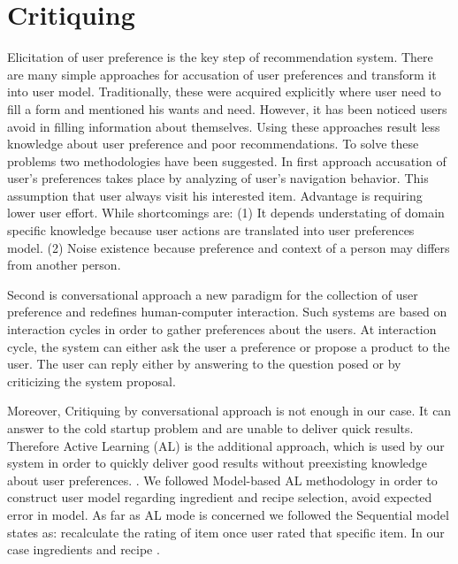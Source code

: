 \section{Critiquing}
Elicitation of user preference is the key step of recommendation system. There are many simple approaches for accusation of user preferences and transform it into user model. Traditionally, these were acquired explicitly where user need to fill a form and mentioned his wants and need. However, it has been noticed users avoid in filling information about themselves. Using these approaches result less knowledge about user preference and poor recommendations. To solve these problems two methodologies have been suggested. In first approach accusation of user’s preferences takes place by analyzing of user’s navigation behavior. This assumption that user always visit his interested item. Advantage is requiring lower user effort. While shortcomings are: (1) It depends understating of domain specific knowledge because user actions are translated into user preferences model. (2) Noise existence because preference and context of a person may differs from another person.\newline

Second is conversational approach a new paradigm for the collection of user preference and redefines human-computer interaction. Such systems are based on interaction cycles in order to gather preferences about the users. At interaction cycle, the system can either ask the user a preference or propose a product to the user. The user can reply either by answering to the question posed or by criticizing the system proposal.\cite{ricci2005critique}\newline

Moreover, Critiquing by conversational approach is not enough in our case. It can answer to the cold startup problem and are unable to deliver quick results. Therefore Active Learning (AL) is the additional approach, which is used by our system in order to quickly deliver good results without preexisting knowledge about user preferences. \cite{lamche2014active}. We followed Model-based AL methodology in order to construct user model regarding ingredient and recipe selection, avoid expected error in model. As far as AL mode is concerned we followed the Sequential model states as: recalculate the rating of item once user rated that specific item. In our case ingredients and recipe \cite{rashid2008learning}.

